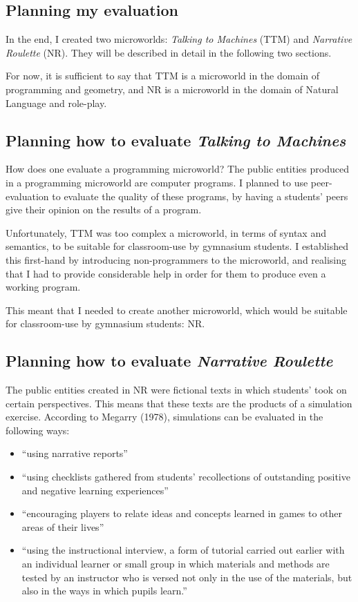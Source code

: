 \subsection{Planning my evaluation}

In the end, I created two microworlds: \textit{Talking to Machines} (TTM) and \textit{Narrative Roulette} (NR). They will be described in detail in the following two sections. 

For now, it is sufficient to say that TTM is a microworld in the domain of programming and geometry, and NR is a microworld in the domain of Natural Language and role-play.

\subsection{Planning how to evaluate \textit{Talking to Machines}}

How does one evaluate a programming microworld? The public entities produced in a programming microworld are computer programs. I planned to use peer-evaluation to evaluate the quality of these programs, by having a students' peers give their opinion on the results of a program.

Unfortunately, TTM was too complex a microworld, in terms of syntax and semantics, to be suitable for classroom-use by gymnasium students. I established this first-hand by introducing non-programmers to the microworld, and realising that I had to provide considerable help in order for them to produce even a working program.

This meant that I needed to create another microworld, which would be suitable for classroom-use by gymnasium students: NR.

\subsection{Planning how to evaluate \textit{Narrative Roulette}}

The public entities created in NR were fictional texts in which students' took on certain perspectives. This means that these texts are the products of a simulation exercise. According to Megarry (1978)\cite[p187-207]{megarry}, simulations can be evaluated in the following ways:

\begin{itemize} 
  \item ``using narrative reports''
  \item ``using checklists gathered from students' recollections of outstanding positive and negative learning experiences''
  \item ``encouraging players to relate ideas and concepts learned in games to other areas of their lives''
  \item ``using the instructional interview, a form of tutorial carried out earlier with an individual learner or small group in which materials and methods are tested by an instructor who is versed not only in the use of the materials, but also in the ways in which pupils learn.''
\end{itemize}

